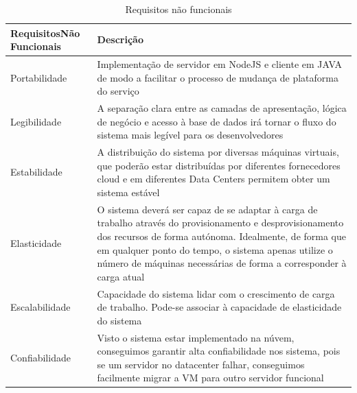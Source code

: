 \documentclass[runningheads]{llncs}
\begin{document}
\begin{table}[H]
	\caption{Requisitos não funcionais}
	\begin{center}
		\begin{tabular}{|p{3.5cm}|p{9.5cm}|}
		\hline
			\textbf{Requisitos\newline Não Funcionais} & \textbf{Descrição}\\ \hline
			Portabilidade & Implementação de servidor em NodeJS e cliente em JAVA de modo a facilitar o processo de mudança de plataforma do serviço \\ \hline
			Legibilidade & A separação clara entre as camadas de apresentação, lógica de negócio e acesso à base de dados irá tornar o fluxo do sistema mais legível para os desenvolvedores \\ \hline
			Estabilidade & A distribuição do sistema por diversas máquinas virtuais, que poderão estar distribuídas por diferentes fornecedores cloud e em diferentes Data Centers permitem obter um sistema estável \\ \hline
			Elasticidade & O sistema deverá ser capaz de se adaptar à carga de trabalho através do provisionamento e desprovisionamento dos recursos de forma autónoma. Idealmente, de forma que em qualquer ponto do tempo, o sistema apenas utilize o número de máquinas necessárias de forma a corresponder à carga atual \\ \hline
			Escalabilidade & Capacidade do sistema lidar com o crescimento de carga de trabalho. Pode-se associar à capacidade de elasticidade do sistema \\ \hline
			Confiabilidade & Visto o sistema estar implementado na núvem, conseguimos garantir alta confiabilidade nos sistema, pois se um servidor no datacenter falhar, conseguimos facilmente migrar a VM para outro servidor funcional \\ \hline
	\end{tabular}
	\label{tab1}
	\end{center}
\end{table}
\end{document}
